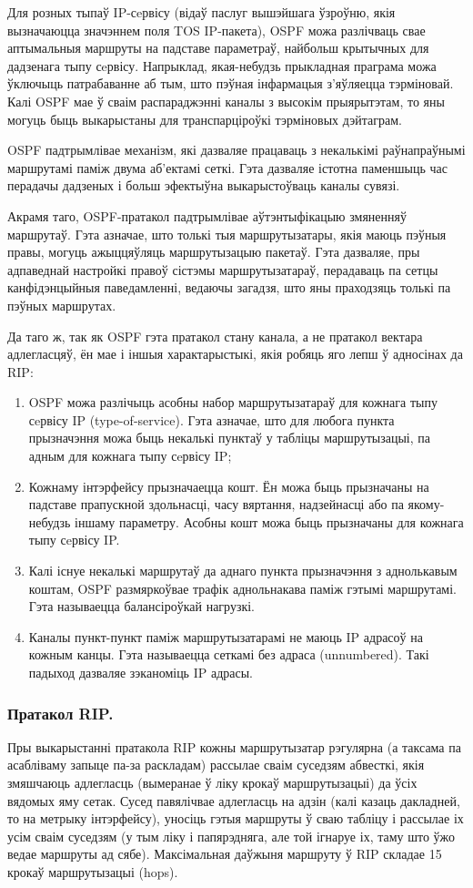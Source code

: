Для розных тыпаў IP-сeрвісу (відаў паслуг вышэйшага ўзроўню, якія вызначаюцца значэннем поля TOS IP-пакета), OSPF можа разлічваць свае аптымальныя маршруты на падставе параметраў, найбольш крытычных для дадзенага тыпу сeрвісу. Напрыклад, якая-небудзь прыкладная праграма можа ўключыць патрабаванне аб тым, што пэўная інфармацыя з'яўляецца тэрміновай. Калі OSPF мае ў сваім распараджэнні каналы з высокім прыярытэтам, то яны могуць быць выкарыстаны для транспарціроўкі тэрміновых дэйтаграм.

OSPF падтрымлівае механізм, які дазваляе працаваць з некалькімі раўнапраўнымі маршрутамі паміж двума аб'ектамі сеткі. Гэта дазваляе істотна паменшыць час перадачы дадзеных і больш эфектыўна выкарыстоўваць каналы сувязі.

Акрамя таго, OSPF-пратакол падтрымлівае аўтэнтыфікацыю змяненняў маршрутаў. Гэта азначае, што толькі тыя маршрутызатары, якія маюць пэўныя правы, могуць ажыццяўляць маршрутызацыю пакетаў. Гэта дазваляе, пры адпаведнай настройкі правоў сістэмы маршрутызатараў, перадаваць па сетцы канфідэнцыйныя паведамленні, ведаючы загадзя, што яны праходзяць толькі па пэўных маршрутах.

Да таго ж, так як OSPF гэта пратакол стану канала, а не пратакол вектара адлегласцяў, ён мае і іншыя характарыстыкі, якія робяць яго лепш ў адносінах да RIP:
\begin{enumerate}
    \item OSPF можа разлічыць асобны набор маршрутызатараў для кожнага тыпу сeрвісу IP (type-of-service). Гэта азначае, што для любога пункта прызначэння можа быць некалькі пунктаў у табліцы маршрутызацыі, па адным для кожнага тыпу сeрвісу IP;
    \item Кожнаму інтэрфейсу прызначаецца кошт. Ён можа быць прызначаны на падставе прапускной здольнасці, часу вяртання, надзейнасці або па якому-небудзь іншаму параметру. Асобны кошт можа быць прызначаны для кожнага тыпу сeрвісу IP.
    \item Калі існуе некалькі маршрутаў да аднаго пункта прызначэння з аднолькавым коштам, OSPF размяркоўвае трафік аднольнакава паміж гэтымі маршрутамі. Гэта называецца балансіроўкай нагрузкі.
    \item Каналы пункт-пункт паміж маршрутызатарамі не маюць IP адрасоў на кожным канцы. Гэта называецца сеткамі без адраса (unnumbered). Такі падыход дазваляе зэканоміць IP адрасы.
\end{enumerate}

\subsubsection{Пратакол RIP.}
Пры выкарыстанні пратакола RIP кожны маршрутызатар рэгулярна (а таксама па асабліваму запыце па-за раскладам) рассылае сваім суседзям абвесткі, якія змяшчаюць адлегласць (вымеранае ў ліку крокаў маршрутызацыі) да ўсіх вядомых яму сетак. Сусед павялічвае адлегласць на адзін (калі казаць дакладней, то на метрыку інтэрфейсу), уносіць гэтыя маршруты ў сваю табліцу і рассылае іх усім сваім суседзям (у тым ліку і папярэдняга, але той ігнаруе іх, таму што ўжо ведае маршруты ад сябе). Максімальная даўжыня маршруту ў RIP складае 15 крокаў маршрутызацыі (hops).

